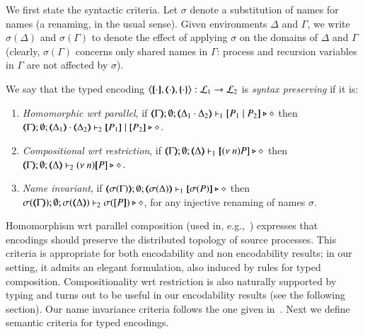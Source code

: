 We first state the syntactic criteria. 
Let $\sigma$ denote a substitution of names for names 
(a renaming, in the usual sense). Given environments $\Delta$ and $\Gamma$,
we write $\sigma(\Delta)$ and $\sigma(\Gamma)$ to denote 
the effect of applying $\sigma$ on the 
domains of $\Delta$ and $\Gamma$
(clearly, $\sigma(\Gamma)$ concerns only shared names in $\Gamma$: process and recursion variables in $\Gamma$ are not affected by $\sigma$). 

\begin{definition}\rm
	\label{def:sep}
	We say that 
	the typed encoding 
	$\enco{\map{\cdot}, \mapt{\cdot}, \mapa{\cdot}}: \tyl{L}_1 \to \tyl{L}_2$ is \emph{syntax preserving}
	if it is:
	
	\begin{enumerate}[1.]
		\item	\emph{Homomorphic wrt parallel},   if 
		$\mapt{\Gamma}; \emptyset; \mapt{\Delta_1 \cat \Delta_2} \proves_1 \map{P_1 \Par P_2} \hastype \Proc$
		then \\
		$\mapt{\Gamma}; \emptyset; \mapt{\Delta_1} \cat \mapt{\Delta_2} \proves_2 \map{P_1} \Par \map{P_2} \hastype \Proc$.

		\item	\emph{Compositional wrt restriction},  if 
		$\mapt{\Gamma}; \emptyset; \mapt{\Delta} \proves_1 \map{\news{n}P} \hastype \Proc$
		then \\
		$\mapt{\Gamma}; \emptyset; \mapt{\Delta} \proves_2 \news{n}\map{P} \hastype \Proc$.
		
		\item \emph{Name invariant},   if
		$\mapt{\sigma(\Gamma)}; \emptyset; \mapt{\sigma(\Delta)} \proves_1 \map{\sigma(P)} \hastype \Proc$
		then \\
		$\sigma(\mapt{\Gamma}); \emptyset; \sigma(\mapt{\Delta}) \proves_2 \sigma(\map{P}) \hastype \Proc$, 
		for any injective renaming  of names $\sigma$.
	\end{enumerate}
\end{definition}
%
Homomorphism wrt parallel composition (used in, e.g.,~\cite{Palamidessi03,DBLP:conf/lics/PalamidessiSVV06})
expresses that encodings should preserve the distributed topology of source processes. This criteria 
is appropriate for both encodability and non encodability results; in our setting, 
it admits an elegant formulation, also induced by rules for typed composition.
Compositionality wrt restriction is 
also naturally supported by typing and turns out to be 
useful in our encodability results (see the following section).
Our name invariance criteria follows the one given in~\cite{DBLP:journals/iandc/Gorla10,DBLP:conf/icalp/LanesePSS10}. 
Next we define semantic criteria for typed encodings.

